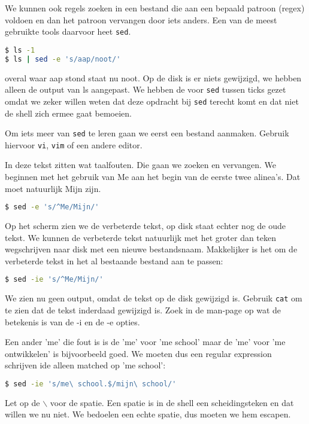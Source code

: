 We kunnen ook regels zoeken in een bestand die aan een bepaald patroon (regex) voldoen en dan het patroon vervangen door iets anders. Een van de meest gebruikte tools daarvoor heet \texttt{sed}.

\begin{lstlisting}[language=bash]
$ ls -1
$ ls | sed -e 's/aap/noot/'
\end{lstlisting}
overal waar aap stond staat nu noot. Op de disk is er niets gewijzigd, we hebben alleen de output van ls aangepast. We hebben de  voor \texttt{sed} tussen ticks gezet omdat we zeker willen weten dat deze opdracht bij \texttt{sed} terecht komt en dat niet de shell zich ermee gaat bemoeien.

Om iets meer van \texttt{sed} te leren gaan we eerst een bestand aanmaken. Gebruik hiervoor \texttt{vi}, \texttt{vim} of een andere editor.


In deze tekst zitten wat taalfouten. Die gaan we zoeken en vervangen. We beginnen met het gebruik van Me aan het begin van de eerste twee alinea's. Dat moet natuurlijk Mijn zijn.
\begin{lstlisting}[language=bash]
$ sed -e 's/^Me/Mijn/'
\end{lstlisting}
Op het scherm zien we de verbeterde tekst, op disk staat echter nog de oude tekst. We kunnen de verbeterde tekst natuurlijk met het groter dan teken wegschrijven naar disk met een nieuwe bestandsnaam. Makkelijker is het om de verbeterde tekst in het al bestaande bestand aan te passen:
\begin{lstlisting}[language=bash]
$ sed -ie 's/^Me/Mijn/'
\end{lstlisting}
We zien nu geen output, omdat de tekst op de disk gewijzigd is. Gebruik \texttt{cat} om te zien dat de tekst inderdaad gewijzigd is. Zoek in de man-page op wat de betekenis is van de -i en de -e opties.

Een ander 'me' die fout is is de 'me' voor 'me school' maar de 'me' voor 'me ontwikkelen' is bijvoorbeeld goed. We moeten dus een regular expression schrijven ide alleen matched op 'me school':
\begin{lstlisting}[language=bash]
$ sed -ie 's/me\ school.$/mijn\ school/'
\end{lstlisting}
Let op de $\backslash$ voor de spatie. Een spatie is in de shell een scheidingsteken en dat willen we nu niet. We bedoelen een echte spatie, dus moeten we hem escapen.
